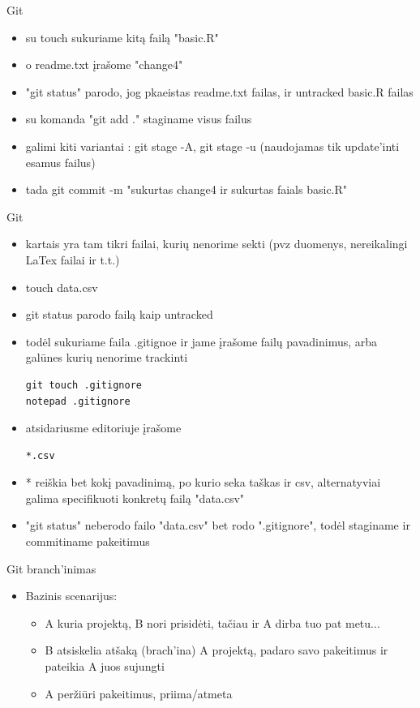 \documentclass[11pt,xcolor=table]{beamer}
\begin{document}

\begin{frame}[fragile]{Git}
\begin{itemize}
\item su touch sukuriame kitą failą "basic.R"
\item o readme.txt įrašome "change4"
\item "git status" parodo, jog pkaeistas readme.txt failas, ir untracked basic.R failas
\item su komanda "git add ." staginame visus failus
\item galimi kiti variantai : git stage -A, git stage -u (naudojamas tik update'inti esamus failus)
\item tada git commit -m "sukurtas change4 ir sukurtas faials basic.R"
\end{itemize}
\end{frame}

\begin{frame}[fragile]{Git}
\begin{itemize}
\item kartais yra tam tikri failai, kurių nenorime sekti (pvz duomenys, nereikalingi LaTex failai ir t.t.)
\item touch data.csv
\item git status parodo failą kaip untracked
\item todėl sukuriame faila .gitignoe ir jame įrašome failų pavadinimus, arba galūnes kurių nenorime trackinti
\begin{lstlisting}
git touch .gitignore
notepad .gitignore
\end{lstlisting}
\item atsidariusme editoriuje įrašome 
\begin{lstlisting}
*.csv 
\end{lstlisting}
\item * reiškia bet kokį pavadinimą, po kurio seka taškas ir csv, alternatyviai galima specifikuoti konkretų failą "data.csv"
\item "git status" neberodo failo "data.csv" bet rodo ".gitignore", todėl staginame ir commitiname pakeitimus
\end{itemize}
\end{frame}

\begin{frame}[fragile]{Git branch'inimas}
\begin{itemize}
\item Bazinis scenarijus:
\begin{itemize}
\item A kuria projektą, B nori prisidėti, tačiau ir A dirba tuo pat metu...
\item B atsiskelia atšaką (brach'ina) A projektą, padaro savo pakeitimus ir pateikia A juos sujungti
\item A peržiūri pakeitimus, priima/atmeta
\end{itemize}
\end{itemize}
\end{frame}
\end{document}
